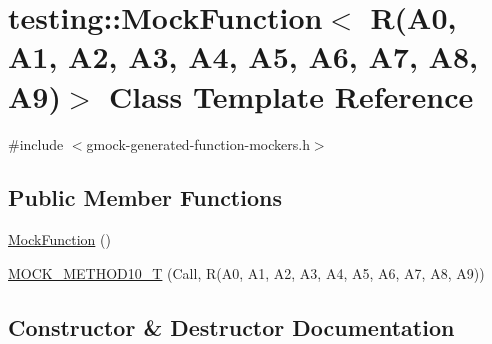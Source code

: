 \hypertarget{classtesting_1_1MockFunction_3_01R_07A0_00_01A1_00_01A2_00_01A3_00_01A4_00_01A5_00_01A6_00_01A7_00_01A8_00_01A9_08_4}{}\section{testing\+::Mock\+Function$<$ R(A0, A1, A2, A3, A4, A5, A6, A7, A8, A9)$>$ Class Template Reference}
\label{classtesting_1_1MockFunction_3_01R_07A0_00_01A1_00_01A2_00_01A3_00_01A4_00_01A5_00_01A6_00_01A7_00_01A8_00_01A9_08_4}


{\ttfamily \#include $<$gmock-\/generated-\/function-\/mockers.\+h$>$}

\subsection*{Public Member Functions}
\begin{DoxyCompactItemize}
\item 
\mbox{\hyperlink{classtesting_1_1MockFunction_3_01R_07A0_00_01A1_00_01A2_00_01A3_00_01A4_00_01A5_00_01A6_00_01A7_00_01A8_00_01A9_08_4_af5faa98b52d5b5032c57022cdf96d21d}{Mock\+Function}} ()
\item 
\mbox{\hyperlink{classtesting_1_1MockFunction_3_01R_07A0_00_01A1_00_01A2_00_01A3_00_01A4_00_01A5_00_01A6_00_01A7_00_01A8_00_01A9_08_4_adb493fcbb4936734eda9cf99b4d0acd0}{M\+O\+C\+K\+\_\+\+M\+E\+T\+H\+O\+D10\+\_\+T}} (Call, R(A0, A1, A2, A3, A4, A5, A6, A7, A8, A9))
\end{DoxyCompactItemize}


\subsection{Constructor \& Destructor Documentation}
\mbox{\label{classtesting_1_1MockFunction_3_01R_07A0_00_01A1_00_01A2_00_01A3_00_01A4_00_01A5_00_01A6_00_01A7_00_01A8_00_01A9_08_4_af5faa98b52d5b5032c57022cdf96d21d}} 
